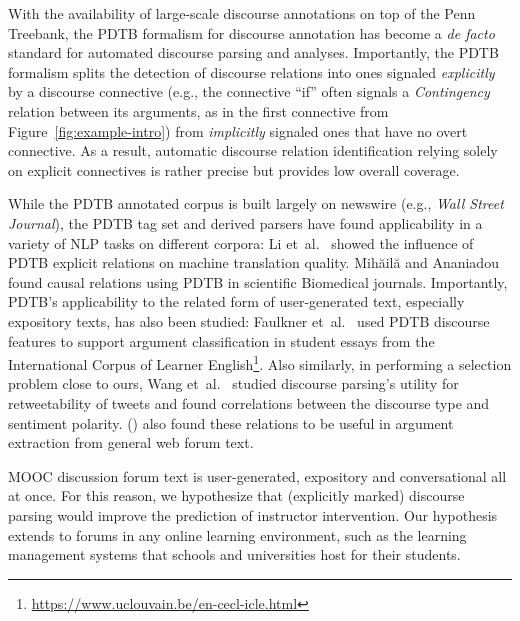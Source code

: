 \documentclass[letterpaper]{article}
\begin{document}
With the availability of large-scale discourse annotations on top of
the Penn Treebank, the PDTB formalism for
discourse annotation has become a {\it de facto} standard for
automated discourse parsing and analyses. Importantly, the PDTB
formalism splits the detection of discourse relations into ones
signaled {\it explicitly} by a discourse connective (e.g., the
connective ``if'' often signals a {\it Contingency} relation between
its arguments, as in the first connective from
Figure~\ref{fig:example-intro}) from {\it implicitly} signaled ones
that have no overt connective. As a result, automatic discourse
relation identification relying solely on explicit connectives is
rather precise but provides low overall coverage.

While the PDTB annotated corpus is built largely on newswire (e.g.,
{\it Wall Street Journal}), the PDTB tag set and derived parsers have
found applicability in a variety of NLP tasks on different corpora: Li
et~al.~ showed the influence of PDTB explicit
relations on machine translation quality.  Mih{\u{a}}il{\u{a}} and
Ananiadou~ found causal relations using PDTB
in scientific Biomedical journals.  Importantly, PDTB's applicability
to the related form of user-generated text, especially expository
texts, has also been studied: Faulkner
et~al.~ used PDTB discourse features
to support argument classification in student essays from the
International Corpus of Learner
English\footnote{\url{https://www.uclouvain.be/en-cecl-icle.html}}.
Also similarly, in performing a selection problem close to ours, Wang
et~al.~ studied discourse parsing's utility for
retweetability of tweets and found correlations between the discourse
type and sentiment polarity.  \citeauthor{swanson2015}
(\citeyear{swanson2015}) also found these relations to be useful in
argument extraction from general web forum text.

MOOC discussion forum text is user-generated, expository and
conversational all at once. For this reason, we hypothesize that
(explicitly marked) discourse parsing would improve the prediction of
instructor intervention. Our hypothesis extends to forums in any
online learning environment, such as the learning management systems
that schools and universities host for their students.
\end{document}
